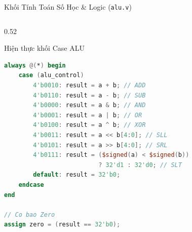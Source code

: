 \begin{frame}[fragile]{Khối Tính Toán Số Học \& Logic (\texttt{alu.v})}
\begin{columns}
        \begin{column}{0.52\textwidth}
            \begin{block}{Hiện thực khối Case ALU}
                \begin{lstlisting}[language=Verilog, basicstyle=\fontsize{6.0pt}{7.2pt}\selectfont\ttfamily, keywordstyle=\color{blue}, commentstyle=\color{gray}]
always @(*) begin
    case (alu_control)
        4'b0010: result = a + b; // ADD
        4'b0110: result = a - b; // SUB
        4'b0000: result = a & b; // AND
        4'b0001: result = a | b; // OR
        4'b0100: result = a ^ b; // XOR
        4'b0011: result = a << b[4:0]; // SLL
        4'b0101: result = a >> b[4:0]; // SRL
        4'b0111: result = ($signed(a) < $signed(b)) 
                          ? 32'd1 : 32'd0; // SLT
        default: result = 32'b0;
    endcase
end

// Co bao Zero
assign zero = (result == 32'b0);
                \end{lstlisting}
            \end{block}
        \end{column}
    \end{columns}
\end{frame}

